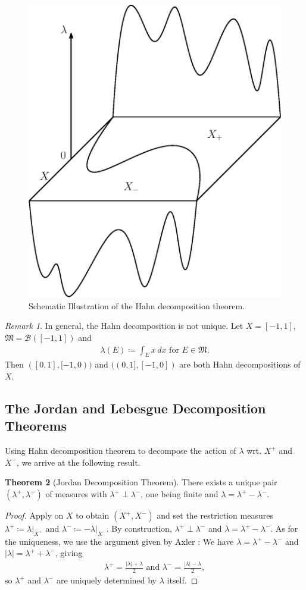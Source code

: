 \documentclass[10pt, leqno]{amsart}
\theoremstyle{definition}
\newtheorem{theorem}{Theorem}[section]
\theoremstyle{remark}
\newtheorem{remark}[theorem]{Remark}
\begin{document}
    \begin{figure}[!hbtp]
        \centering
        \includegraphics[width=0.4\linewidth]{img/hahn.eps}
        \caption{Schematic Illustration of the Hahn decomposition theorem.}
        \label{fig:hahn_decomposition_illustration}
    \end{figure}

    \begin{remark}
        In general, the Hahn decomposition is not unique. Let \(X = [-1, 1]\), \(\mathfrak{M} = \mathcal{B}([-1, 1])\) and
        \begin{align}
            \lambda(E) \coloneqq \int_E x \, dx \text{ for } E \in \mathfrak{M}.
        \end{align}
        Then \(([0, 1], [-1, 0))\) and \(((0, 1], [-1, 0])\) are both Hahn decompositions of \(X\).
    \end{remark}

    \subsection{The Jordan and Lebesgue Decomposition Theorems}

    Using Hahn decomposition theorem to decompose the action of \(\lambda\) wrt. \(X^+\) and \(X^-\), we arrive at the following result.

    \begin{theorem}[Jordan Decomposition Theorem] \label{thm:jordan_decomposition}
        There exists a unique pair \((\lambda^+, \lambda^-)\) of measures with \(\lambda^+ \perp \lambda^-\), one being finite and \(\lambda = \lambda^+ - \lambda^-\).
    \end{theorem}

    \begin{proof}
        Apply  on \(X\) to obtain \((X^+, X^-)\) and set the restriction measures \(\lambda^+ \coloneqq \lambda|_{X^+}\) and \(\lambda^- \coloneqq -\lambda|_{X^-}\). By construction, \(\lambda^+ \perp \lambda^-\) and \(\lambda = \lambda^+ - \lambda^-\). As for the uniqueness, we use the argument given by Axler \cite[p. 269]{Axler}: We have \(\lambda = \lambda^+ - \lambda^-\) and \(|\lambda| = \lambda^+ + \lambda^-\), giving
        \begin{align}
            \lambda^+ = \frac{|\lambda|+\lambda}{2} \text{ and } \lambda^- = \frac{|\lambda|-\lambda}{2},
        \end{align}
        so \(\lambda^+\) and \(\lambda^-\) are uniquely determined by \(\lambda\) itself.
    \end{proof}
\end{document}

